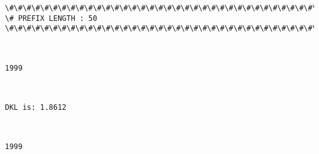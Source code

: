 \documentclass[11pt]{article}
\begin{document}
    \begin{Verbatim}[commandchars=\\\{\}]
\#\#\#\#\#\#\#\#\#\#\#\#\#\#\#\#\#\#\#\#\#\#\#\#\#\#\#\#\#\#\#\#\#\#\#\#\#\#\#\#\#\#\#\#\#\#\#\#\#\#\#\#\#\#\#\#\#\#\#\#\#\#\#\#\#\#\#\#\#\#\#\#\#\#\#\#
\# PREFIX LENGTH : 50
\#\#\#\#\#\#\#\#\#\#\#\#\#\#\#\#\#\#\#\#\#\#\#\#\#\#\#\#\#\#\#\#\#\#\#\#\#\#\#\#\#\#\#\#\#\#\#\#\#\#\#\#\#\#\#\#\#\#\#\#\#\#\#\#\#\#\#\#\#\#\#\#\#\#\#\#

    \end{Verbatim}

    \begin{center}
    \end{center}
    { \hspace*{\fill} \\}
    
    \begin{Verbatim}[commandchars=\\\{\}]
1999

    \end{Verbatim}

    \begin{center}
    \end{center}
    { \hspace*{\fill} \\}
    
    \begin{Verbatim}[commandchars=\\\{\}]
DKL is: 1.8612

    \end{Verbatim}

    \begin{center}
    \end{center}
    { \hspace*{\fill} \\}
    
    \begin{Verbatim}[commandchars=\\\{\}]
1999

    \end{Verbatim}

    \begin{center}
    \end{center}
    { \hspace*{\fill} \\}
    
\end{document}
